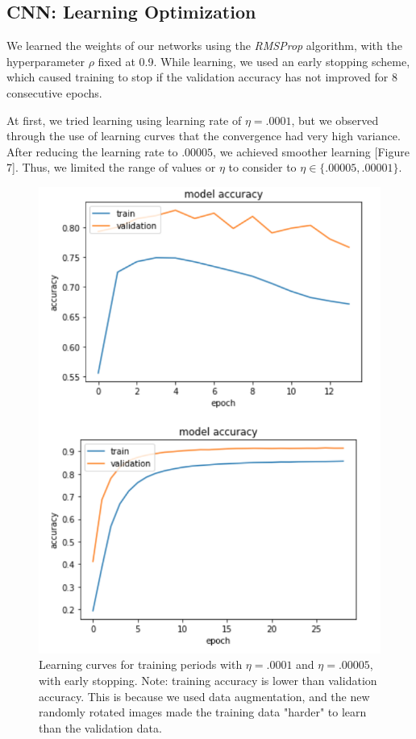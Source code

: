 \documentclass[letterpaper, 10 pt, conference]{ieeeconf}
\begin{document}
\subsection{CNN: Learning Optimization} 

We learned the weights of our networks using the \emph{RMSProp} algorithm, with the hyperparameter $\rho$ fixed at 0.9. While learning, we used an early stopping scheme, which caused training to stop if the validation accuracy has not improved for 8 consecutive epochs. 

At first, we tried learning using learning rate of $\eta = .0001$, but we observed through the use of learning curves that the convergence had very high variance. After reducing the learning rate to $.00005$, we achieved smoother learning [Figure 7]. Thus, we limited the range of values or $\eta$ to consider to $\eta \in \{.00005, .00001\}$.

\begin{figure}
      \centering
      \includegraphics[scale = .6]{learning_curves.png}
		\centering
      \caption{Learning curves for training periods with $\eta = .0001$ and $\eta = .00005$, with early stopping. Note: training accuracy is lower than validation accuracy. This is because we used data augmentation, and the new randomly rotated images made the training data "harder" to learn than the validation data.}
      \label{figurelabel}
\end{figure}
\end{document}
